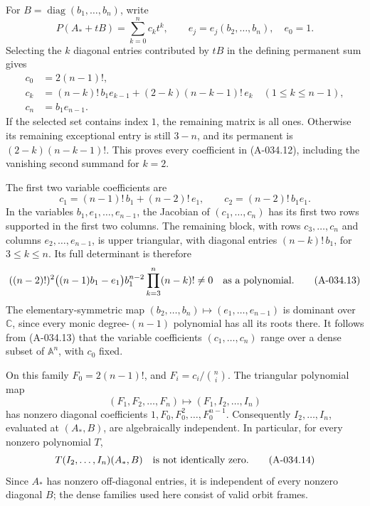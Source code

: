 For \(B=\operatorname{diag}(b_1,\ldots,b_n)\), write
\[
 P(A_*+tB)=\sum_{k=0}^n c_k t^k,
 \qquad e_j=e_j(b_2,\ldots,b_n),\quad e_0=1.
\]
Selecting the \(k\) diagonal entries contributed by \(tB\)
in the defining permanent sum gives
\[
 \begin{split}
 c_0&=2(n-1)!,\\
 c_k&=(n-k)!\,b_1 e_{k-1}
            +(2-k)(n-k-1)!\,e_k\quad(1\leq k\leq n-1),\\
 c_n&=b_1e_{n-1}.
 \end{split}                                                   \tag{A-034.12}
\]
If the selected set contains index \(1\), the remaining
matrix is all ones. Otherwise its remaining exceptional
entry is still \(3-n\), and its permanent is
\((2-k)(n-k-1)!\). This proves every coefficient in
(A-034.12), including the vanishing second summand for
\(k=2\).

The first two variable coefficients are
\[
 c_1=(n-1)!\,b_1+(n-2)!\,e_1,\qquad
 c_2=(n-2)!\,b_1e_1.
 \]
In the variables \(b_1,e_1,\ldots,e_{n-1}\), the Jacobian
of \((c_1,\ldots,c_n)\) has its first two rows supported
in the first two columns. The remaining block, with rows
\(c_3,\ldots,c_n\) and columns \(e_2,\ldots,e_{n-1}\),
is upper triangular, with diagonal entries
\((n-k)!\,b_1\), for \(3\leq k\leq n\).
Its full determinant is therefore
\[
 ((n-2)!)^2\bigl((n-1)b_1-e_1\bigr)
              b_1^{n-2}\prod_{k=3}^n(n-k)! \ne0
                          \quad\hbox{as a polynomial}.        \tag{A-034.13}
\]
The elementary-symmetric map
\((b_2,\ldots,b_n)\mapsto(e_1,\ldots,e_{n-1})\)
is dominant over \(\mathbb C\), since every monic
degree-\((n-1)\) polynomial has all its roots there.
It follows from (A-034.13) that the variable coefficients
\((c_1,\ldots,c_n)\) range over a dense subset of
\(\mathbb A^n\), with \(c_0\) fixed.

On this family \(F_0=2(n-1)!\), and
\(F_i=c_i/\binom ni\). The triangular polynomial map
\[
     (F_1,F_2,\ldots,F_n)
               \longmapsto(F_1,I_2,\ldots,I_n)
 \]
has nonzero diagonal coefficients
\(1,F_0,F_0^2,\ldots,F_0^{n-1}\).
Consequently \(I_2,\ldots,I_n\), evaluated at
\((A_*,B)\), are algebraically independent.
In particular, for every nonzero polynomial \(T\),
\[
                 T(I_2,\ldots,I_n)(A_*,B)
                      \quad\hbox{is not identically zero}.    \tag{A-034.14}
\]
Since \(A_*\) has nonzero off-diagonal entries, it is
independent of every nonzero diagonal \(B\); the dense
families used here consist of valid orbit frames.


